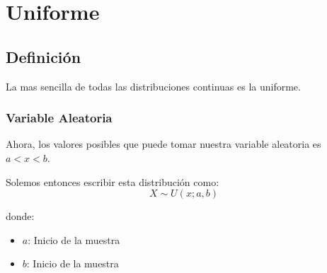 \documentclass[12pt, fleqn]{report}                             %
\theoremstyle{break}                                            %
\begin{document}
        \clearpage
        \section{Uniforme}

            \subsection{Definición}

                La mas sencilla de todas las distribuciones continuas es la uniforme.

                \vspace{1em}
                \subsubsection{Variable Aleatoria}


                    Ahora, los valores posibles que puede tomar nuestra variable aleatoria es
                    $ a< x < b$.

                    Solemos entonces escribir esta distribución como:
                    \begin{equation*}
                        X \sim U(x; a, b)
                    \end{equation*}

                    donde:
                    \begin{itemize}
                        \item $a$: Inicio de la muestra
                        \item $b$: Inicio de la muestra
                    \end{itemize}


            \clearpage
\end{document}
